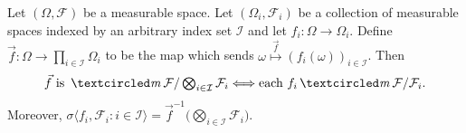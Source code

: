 \begin{theorem}
\label{thm: clump}
Let $(\Omega, \mathcal F)$ be a measurable space.
Let $(\Omega_i, \mathcal F_i)$ be a collection of measurable spaces indexed by an arbitrary index set $\mathcal I$ and let $f_i:\Omega\rightarrow \Omega_i$. Define $\vec f\colon \Omega \rightarrow \prod_{i\in \mathcal I} \Omega_i$ to be the map which sends $\omega \overset{\vec f}\mapsto (f_i(\omega))_{i\in\mathcal I}$. Then
\[
\text{$\vec f$ is $\mcirc \mathcal F / \textstyle\bigotimes_{i\in\mathcal I} \mathcal F_i$}
\Longleftrightarrow
\text{each $f_i \mcirc \mathcal F/\mathcal F_i$}.
\] Moreover, $\sigma\langle f_i,\mathcal F_i\colon i\in\mathcal I \rangle = \vec f^{-1}\bigl(\bigotimes_{i\in\mathcal I} \mathcal F_i\bigr)$.
\end{theorem}


